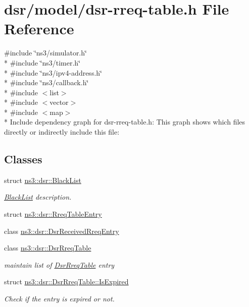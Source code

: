 \hypertarget{dsr-rreq-table_8h}{}\section{dsr/model/dsr-\/rreq-\/table.h File Reference}
\label{dsr-rreq-table_8h}
{\ttfamily \#include \char`\"{}ns3/simulator.\+h\char`\"{}}\\*
{\ttfamily \#include \char`\"{}ns3/timer.\+h\char`\"{}}\\*
{\ttfamily \#include \char`\"{}ns3/ipv4-\/address.\+h\char`\"{}}\\*
{\ttfamily \#include \char`\"{}ns3/callback.\+h\char`\"{}}\\*
{\ttfamily \#include $<$list$>$}\\*
{\ttfamily \#include $<$vector$>$}\\*
{\ttfamily \#include $<$map$>$}\\*
Include dependency graph for dsr-\/rreq-\/table.h\+:
This graph shows which files directly or indirectly include this file\+:
\subsection*{Classes}
\begin{DoxyCompactItemize}
\item 
struct \hyperlink{structns3_1_1dsr_1_1BlackList}{ns3\+::dsr\+::\+Black\+List}
\begin{DoxyCompactList}\small\item\em \hyperlink{structns3_1_1dsr_1_1BlackList}{Black\+List} description. \end{DoxyCompactList}\item 
struct \hyperlink{structns3_1_1dsr_1_1RreqTableEntry}{ns3\+::dsr\+::\+Rreq\+Table\+Entry}
\item 
class \hyperlink{classns3_1_1dsr_1_1DsrReceivedRreqEntry}{ns3\+::dsr\+::\+Dsr\+Received\+Rreq\+Entry}
\item 
class \hyperlink{classns3_1_1dsr_1_1DsrRreqTable}{ns3\+::dsr\+::\+Dsr\+Rreq\+Table}
\begin{DoxyCompactList}\small\item\em maintain list of \hyperlink{classns3_1_1dsr_1_1DsrRreqTable}{Dsr\+Rreq\+Table} entry \end{DoxyCompactList}\item 
struct \hyperlink{structns3_1_1dsr_1_1DsrRreqTable_1_1IsExpired}{ns3\+::dsr\+::\+Dsr\+Rreq\+Table\+::\+Is\+Expired}
\begin{DoxyCompactList}\small\item\em Check if the entry is expired or not. \end{DoxyCompactList}\end{DoxyCompactItemize}
